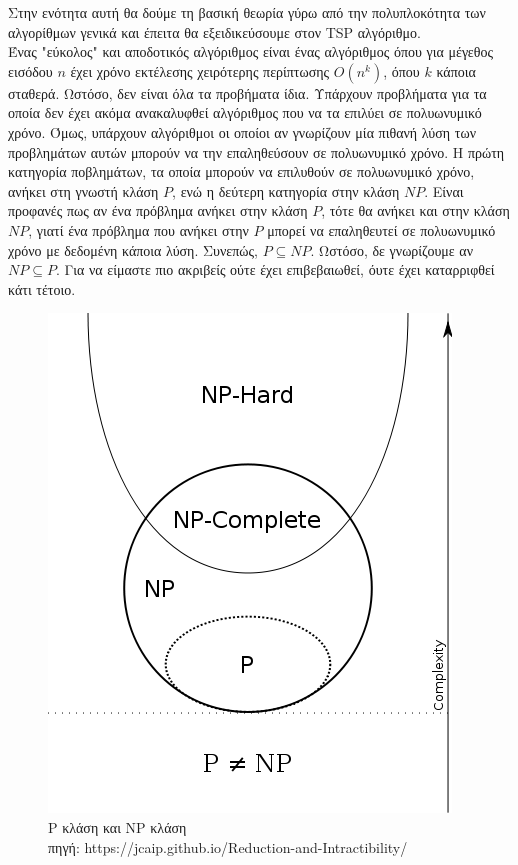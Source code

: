 \documentclass[oneside,12pt]{book}
\newenvironment{matlab}
	{\begin{figure}[hp]\centering\captionsetup{justification=centering}}
	{\end{figure}}
\theoremstyle{definition}
\begin{document}
Στην ενότητα αυτή θα δούμε τη βασική θεωρία γύρω από την πολυπλοκότητα των αλγορίθμων γενικά και έπειτα θα εξειδικεύσουμε στον TSP αλγόριθμο. \\

Ένας "εύκολος" και αποδοτικός αλγόριθμος είναι ένας αλγόριθμος όπου για μέγεθος εισόδου \(n\) έχει χρόνο εκτέλεσης χειρότερης περίπτωσης \(Ο(n^k)\), όπου \(k\) κάποια σταθερά. Ωστόσο, δεν είναι όλα τα προβήματα ίδια. Υπάρχουν προβλήματα για τα οποία δεν έχει ακόμα ανακαλυφθεί αλγόριθμος που να τα επιλύει σε πολυωνυμικό χρόνο. Όμως, υπάρχουν αλγόριθμοι οι οποίοι αν γνωρίζουν μία πιθανή λύση των προβλημάτων αυτών μπορούν να την επαληθεύσουν σε πολυωνυμικό χρόνο. Η πρώτη κατηγορία ποβλημάτων, τα οποία μπορούν να επιλυθούν σε πολυωνυμικό χρόνο, ανήκει στη γνωστή κλάση \(P\), ενώ η δεύτερη κατηγορία στην κλάση \(NP\). Είναι προφανές πως αν ένα πρόβλημα ανήκει στην κλάση \(P\), τότε θα ανήκει και στην κλάση \(NP\), γιατί ένα πρόβλημα που ανήκει στην \(P\) μπορεί να επαληθευτεί σε πολυωνυμικό χρόνο με δεδομένη κάποια λύση. Συνεπώς, \(P \subseteq NP\). Ωστόσο, δε γνωρίζουμε αν \(NP \subseteq P\). Για να είμαστε πιο ακριβείς ούτε έχει επιβεβαιωθεί, όυτε έχει καταρριφθεί κάτι τέτοιο. \\

\begin{matlab}
	\includegraphics[scale=0.5]{images/complexity_classes.png}
	\caption{P κλάση και NP κλάση \\ πηγή: https://jcaip.github.io/Reduction-and-Intractibility/}
\end{matlab}
\end{document}
